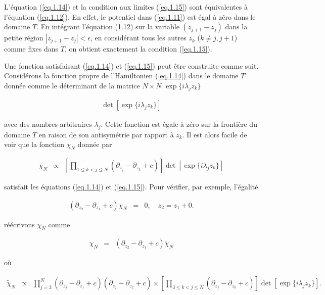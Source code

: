 L'équation (\ref{eq.1.14}) et la condition aux limites (\ref{eq.1.15}) sont équivalentes à l'équation (\ref{eq.1.12}). En effet, le potentiel dans (\ref{eq.1.11}) est égal à zéro dans le domaine \(T\). En intégrant l'équation (1.12) sur la variable \((z_{j+1} - z_j)\) dans la petite région \(|z_{j+1} - z_j| < \epsilon\), en considérant tous les autres \(z_k\) (\(k \neq j,j+1\)) comme fixes dans \(T\), on obtient exactement la condition (\ref{eq.1.15}).

Une fonction satisfaisant (\ref{eq.1.14}) et (\ref{eq.1.15}) peut être construite comme suit. Considérons la fonction propre de l'Hamiltonien (\ref{eq.1.14}) dans le domaine \(T\) donnée comme le déterminant de la matrice \(N \times N\) \(\exp\{i\lambda_j z_k \}\)

\begin{eqnarray}
	\det [ \exp\{i\lambda_j z_k \}] 
\end{eqnarray}

avec des nombres arbitraires \(\lambda_j\). Cette fonction est égale à zéro sur la frontière du domaine \(T\) en raison de son antisymétrie par rapport à \(z_k\). Il est alors facile de voir que la fonction \(\chi_N\) donnée par

\begin{eqnarray}
	\chi_N & \propto & \left [  \prod_{ 1 \leq k < j \leq N } \left ( \partial_{z_j} - \partial_{z_k} +c \right ) \right ] \det [ \exp\{i\lambda_j z_k \}] 	\label{eq.1.17}
\end{eqnarray}

satisfait les équations (\ref{eq.1.14}) et (\ref{eq.1.15}). Pour vérifier, par exemple, l'égalité

\begin{eqnarray}
	\left( \partial_{z_2} - \partial_{z_1} +c \right )	\chi_N & =& 	 0 , \quad z_{2} = z_1 + 0  \label{eq.1.18}.
\end{eqnarray}

réécrivons $\chi_N$ comme

\begin{eqnarray}
	\chi_N & =& \left( \partial_{z_2} - \partial_{z_1} + c \right ) \tilde{\chi}_N
\end{eqnarray}

où

\begin{eqnarray}
	\tilde{\chi}_N & \propto & 	\prod_{j=3 }^N \left ( \partial_{z_j} - \partial_{z_1} +c \right )	\left ( \partial_{z_j} - \partial_{z_2} +c \right ) \times \left [  \prod_{ 3 \leq k < j \leq N } \left ( \partial_{z_j} - \partial_{z_k} +c \right ) \right ] \det [ \exp\{i\lambda_j z_k \}] 	.
\end{eqnarray}

